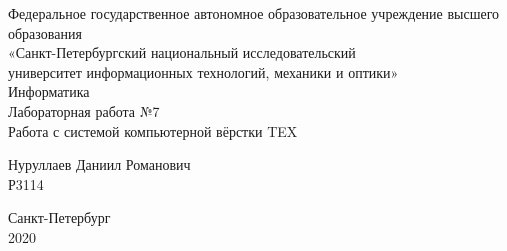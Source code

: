 \begin{center}
Федеральное государственное автономное образовательное учреждение высшего  \\
образования \\
«Санкт-Петербургский национальный исследовательский \\
университет информационных технологий, механики и 		 оптики»\\
\vspace{1cm}
Информатика \\ \vspace{5cm}
Лабораторная работа №7 \\
Работа с системой компьютерной вёрстки TEX \vspace{5cm}
\end{center}
\begin{flushright}
Нуруллаев Даниил Романович \\
Р3114 \\
\end{flushright}
\vfill
\begin{center}
Санкт-Петербург \\ 
2020
\end{center}
